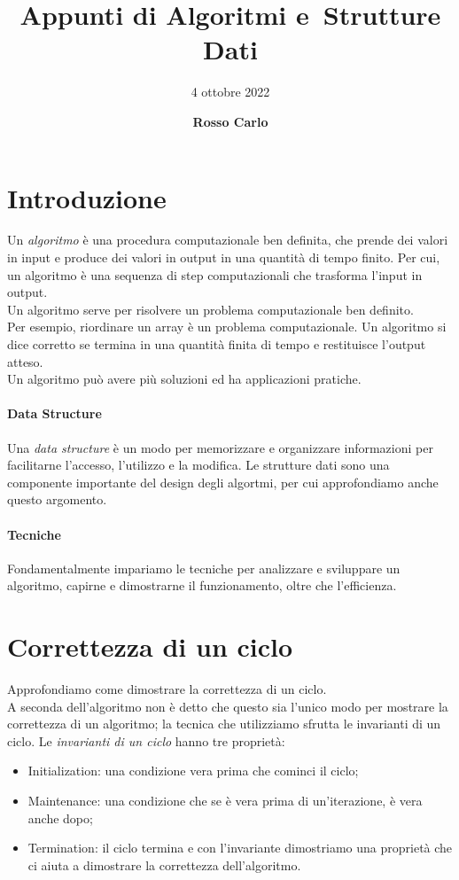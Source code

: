 \documentclass{article}
\title{\vspace{2cm}\textbf{Appunti di Algoritmi e\ Strutture Dati}}
\author{\vspace{3mm}4 ottobre 2022}
\date{\vspace{3mm} \textbf{Rosso Carlo}}
\begin{document}
\begin{titlepage}
	\maketitle
	\thispagestyle{empty}
\end{titlepage}
\tableofcontents
\newpage

\section{Introduzione}
Un \textit{algoritmo} è una procedura computazionale ben definita, che prende dei valori
in input e produce dei valori in output in una quantità di tempo finito. Per cui,
un algoritmo è una sequenza di step computazionali che trasforma l'input in
output.\\
Un algoritmo serve per risolvere un problema computazionale ben definito.\\
Per esempio, riordinare un array è un problema computazionale.
Un algoritmo si dice corretto se termina in una quantità finita di tempo e
restituisce l'output atteso.\\
Un algoritmo può avere più soluzioni ed ha applicazioni pratiche.

\paragraph{Data Structure} Una \textit{data structure} è un modo per memorizzare e
organizzare informazioni per facilitarne l'accesso, l'utilizzo e la modifica.
Le strutture dati sono una componente importante del design degli algortmi, per
cui approfondiamo anche questo argomento.

\paragraph{Tecniche} Fondamentalmente impariamo le tecniche per analizzare e
sviluppare un algoritmo, capirne e dimostrarne il funzionamento, oltre che
l'efficienza.

\section{Correttezza di un ciclo}
Approfondiamo come dimostrare la correttezza di un ciclo.\\
A seconda dell'algoritmo non è detto che questo sia l'unico modo per mostrare la
correttezza di un algoritmo; la tecnica che utilizziamo sfrutta le invarianti di
un ciclo. Le \textit{invarianti di un ciclo} hanno tre proprietà:
\begin{itemize}
	\item Initialization: una condizione vera prima che cominci il ciclo;
	\item Maintenance: una condizione che se è vera prima di un'iterazione, è
	      vera anche dopo;
	\item Termination: il ciclo termina e con l'invariante dimostriamo una
	      proprietà che ci aiuta a dimostrare la correttezza dell'algoritmo.
\end{itemize}
\end{document}

